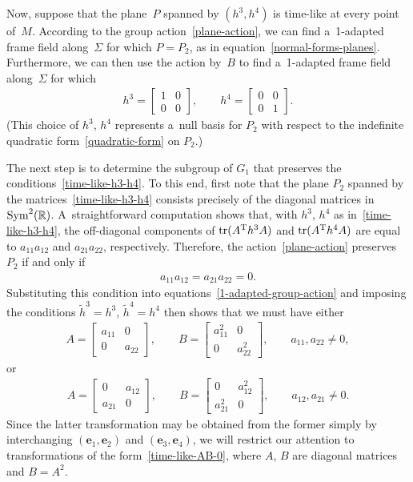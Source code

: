 \documentclass[pdftex]{sigma}
\numberwithin{equation}{section}
\theoremstyle{definition}
\DeclareMathOperator{\tr}{tr}
\begin{document}
Now, suppose that the plane~$P$ spanned by $(h^3, h^4)$ is time-like at every point of~$M$.
According to the group action~\eqref{plane-action}, we can f\/ind a~1-adapted frame f\/ield along~$\Sigma$ for which
$P=P_2$, as in equation~\eqref{normal-forms-planes}.
Furthermore, we can then use the action by~$B$ to f\/ind a~1-adapted frame f\/ield along~$\Sigma$ for which
\begin{gather}
\label{time-like-h3-h4}
h^3 =
\begin{bmatrix}
1 & 0
\\
0 & 0
\end{bmatrix},
\qquad
h^4 =
\begin{bmatrix}
0 & 0
\\
0 & 1
\end{bmatrix}.
\end{gather}
(This choice of $h^3$, $h^4$ represents a~null basis for $P_2$ with respect to the indef\/inite quadratic
form~\eqref{quadratic-form} on $P_2$.)

The next step is to determine the subgroup of $G_1$ that preserves the conditions~\eqref{time-like-h3-h4}.
To this end, f\/irst note that the plane $P_2$ spanned by the matrices~\eqref{time-like-h3-h4} consists precisely of the
diagonal matrices in ${\rm Sym}^2(\mathbb{R})$.
A~straightforward computation shows that, with $h^3$, $h^4$ as in~\eqref{time-like-h3-h4}, the of\/f-diagonal components of
$\tr(A^{\rm T} h^3 A)$ and $\tr(A^{\rm T} h^4 A)$ are equal to $a_{11}a_{12}$ and $a_{21}a_{22}$, respectively.
Therefore, the action~\eqref{plane-action} preserves $P_2$ if and only if
\begin{gather*}
a_{11}a_{12} = a_{21}a_{22} = 0.
\end{gather*}
Substituting this condition into equations~\eqref{1-adapted-group-action} and imposing the conditions $\tilde{h}^3 =
h^3$, $\tilde{h}^4 = h^4$ then shows that we must have either
\begin{gather}
A=
\begin{bmatrix}
a_{11} & 0
\\
0 & a_{22}
\end{bmatrix},
\qquad
B =
\begin{bmatrix}
a_{11}^2 & 0
\\
0 & a_{22}^2
\end{bmatrix},
\qquad
a_{11}, a_{22} \neq 0,
\label{time-like-AB-0}
\end{gather}
or
\begin{gather*}
A =
\begin{bmatrix}
0 & a_{12}
\\
a_{21} & 0
\end{bmatrix},
\qquad
B =
\begin{bmatrix}
0 & a_{12}^2
\\
a_{21}^2 & 0
\end{bmatrix},
\qquad
a_{12}, a_{21} \neq 0.
\end{gather*}
Since the latter transformation may be obtained from the former simply by interchanging $(\mathbf{e}_1, \mathbf{e}_2)$
and $(\mathbf{e}_3, \mathbf{e}_4)$, we will restrict our attention to transformations of the form~\eqref{time-like-AB-0},
where $A$, $B$ are diagonal matrices and $B = A^2$.
\end{document}
